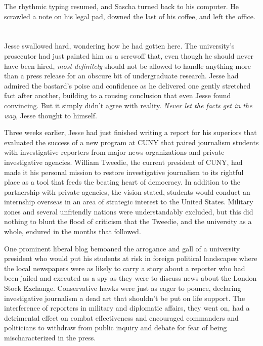 \documentclass[12pt]{book}
\begin{document}
The rhythmic typing resumed, and Sascha turned back to his computer.  He scrawled a note on his legal pad, downed the last of his coffee, and left the office.

\chapter{}
								
Jesse swallowed hard, wondering how he had gotten here.  The university's prosecutor had just painted him as a screwoff that, even though he should never have been hired, \emph{most definitely} should not be allowed to handle anything more than a press release for an obscure bit of undergraduate research.  Jesse had admired the bastard's poise and confidence as he delivered one gently stretched fact after another, building to a rousing conclusion that even Jesse found convincing.  But it simply didn't agree with reality.  \emph{Never let the facts get in the way}, Jesse thought to himself.

Three weeks earlier, Jesse had just finished writing a report for his superiors that evaluated the success of a new program at CUNY that paired journalism students with investigative reporters from major news organizations and private investigative agencies.  William Tweedie, the current president of CUNY, had made it his personal mission to restore investigative journalism to its rightful place as a tool that feeds the beating heart of democracy.  In addition to the partnership with private agencies, the vision stated, students would conduct an internship overseas in an area of strategic interest to the United States.  Military zones and several unfriendly nations were understandably excluded, but this did nothing to blunt the flood of criticism that the Tweedie, and the university as a whole, endured in the months that followed.

One prominent liberal blog bemoaned the arrogance and gall of a university president who would put his students at risk in foreign political landscapes where the local newspapers were as likely to carry a story about a reporter who had been jailed and executed as a spy as they were to discuss news about the London Stock Exchange.  Conservative hawks were just as eager to pounce, declaring investigative journalism a dead art that shouldn't be put on life support.  The interference of reporters in military and diplomatic affairs, they went on, had a detrimental effect on combat effectiveness and encouraged commanders and politicians to withdraw from public inquiry and debate for fear of being mischaracterized in the press.
\end{document}
